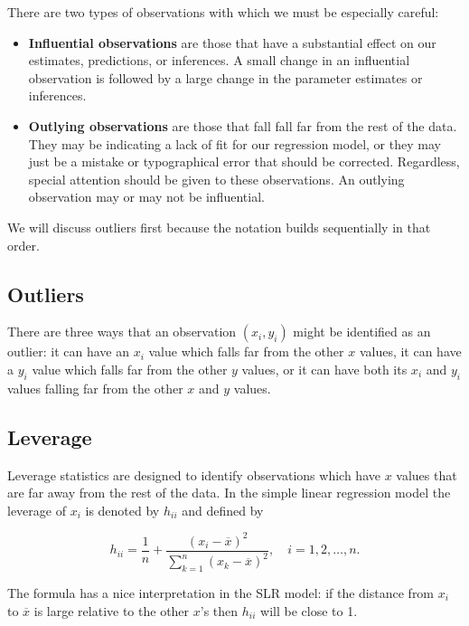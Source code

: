 \documentclass[]{book}
\providecommand{\tightlist}{%
  \setlength{\itemsep}{0pt}\setlength{\parskip}{0pt}}
\numberwithin{equation}{chapter}
\numberwithin{figure}{chapter}
\theoremstyle{plain}
\theoremstyle{definition}
\theoremstyle{remark}
\theoremstyle{definition}
\theoremstyle{definition}
\theoremstyle{remark}
\begin{document}
There are two types of observations with which we must be especially
careful:

\begin{itemize}
\tightlist
\item
  \textbf{Influential observations} are those that have a substantial
  effect on our estimates, predictions, or inferences. A small change in
  an influential observation is followed by a large change in the
  parameter estimates or inferences.
\item
  \textbf{Outlying observations} are those that fall fall far from the
  rest of the data. They may be indicating a lack of fit for our
  regression model, or they may just be a mistake or typographical error
  that should be corrected. Regardless, special attention should be
  given to these observations. An outlying observation may or may not be
  influential.
\end{itemize}

We will discuss outliers first because the notation builds sequentially
in that order.

\subsection{Outliers}\label{outliers}

There are three ways that an observation \((x_{i},y_{i})\) might be
identified as an outlier: it can have an \(x_{i}\) value which falls far
from the other \(x\) values, it can have a \(y_{i}\) value which falls
far from the other \(y\) values, or it can have both its \(x_{i}\) and
\(y_{i}\) values falling far from the other \(x\) and \(y\) values.

\subsection{Leverage}\label{leverage}

Leverage statistics are designed to identify observations which have
\(x\) values that are far away from the rest of the data. In the simple
linear regression model the leverage of \(x_{i}\) is denoted by
\(h_{ii}\) and defined by

\begin{equation}
h_{ii}=\frac{1}{n}+\frac{(x_{i}-\overline{x})^{2}}{\sum_{k=1}^{n}(x_{k}-\overline{x})^{2}},\quad i=1,2,\ldots,n.
\end{equation}

The formula has a nice interpretation in the SLR model: if the distance
from \(x_{i}\) to \(\overline{x}\) is large relative to the other
\(x\)'s then \(h_{ii}\) will be close to 1.
\end{document}
